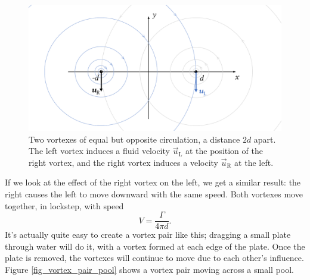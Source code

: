 \begin{figure}
\centering\includegraphics[width=0.8\linewidth]{Figures/Chapter4/fig_vortex_pair1}
\caption{Two vortexes of equal but opposite circulation, a distance $2d$ apart.  The left vortex induces a fluid velocity $\vec{u}_\text{L}$ at the position of the right vortex, and the right vortex induces a velocity $\vec{u}_\text{R}$ at the left.}
\label{fig_vortex_pair1}
\end{figure}

If we look at the effect of the right vortex on the left, we get a similar result:  the right causes the left to move downward with the same speed.  Both vortexes move together, in lockstep, with speed
\begin{equation}
V = \frac{\Gamma}{4\pi d}.
\end{equation}
It's actually quite easy to create a vortex pair like this; dragging a small plate through water will do it, with a vortex formed at each edge of the plate.  Once the plate is removed, the vortexes will continue to move due to each other's influence.  Figure \ref{fig_vortex_pair_pool} shows a vortex pair moving across a small pool.

